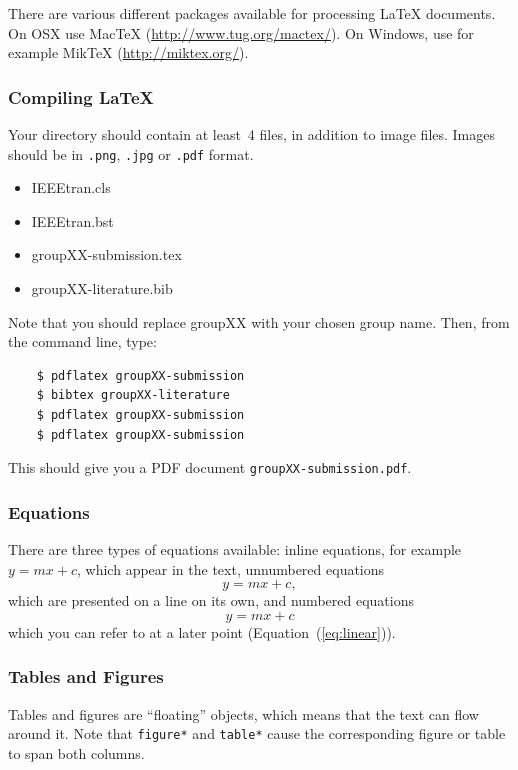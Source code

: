 \documentclass[10pt,conference,compsocconf]{IEEEtran}
\begin{document}
	There are various different packages available for processing \LaTeX{}
	documents.
	On OSX use Mac\TeX{}
	(\url{http://www.tug.org/mactex/}). On Windows, use for example Mik\TeX{} (\url{http://miktex.org/}).
	
	\subsubsection{Compiling \LaTeX{}}
	Your directory should contain at least~4 files, in addition to image
	files. Images should be in \texttt{.png}, \texttt{.jpg} or
	\texttt{.pdf} format.
	\begin{itemize}
		\item IEEEtran.cls
		\item IEEEtran.bst
		\item groupXX-submission.tex
		\item groupXX-literature.bib
	\end{itemize}
	Note that you should replace groupXX with your chosen group name.
	Then, from the command line, type:
	\begin{verbatim}
	$ pdflatex groupXX-submission
	$ bibtex groupXX-literature
	$ pdflatex groupXX-submission
	$ pdflatex groupXX-submission
	\end{verbatim}
	This should give you a PDF document \texttt{groupXX-submission.pdf}.
	
	\subsubsection{Equations}
	
	There are three types of equations available: inline equations, for
	example $y=mx + c$, which appear in the text, unnumbered equations
	$$y=mx + c,$$
	which are presented on a line on its own, and numbered equations
	\begin{equation}
	\label{eq:linear}
	y = mx + c
	\end{equation}
	which you can refer to at a later point (Equation~(\ref{eq:linear})).
	
	\subsubsection{Tables and Figures}
	
	Tables and figures are ``floating'' objects, which means that the text
	can flow around it.
	Note
	that \texttt{figure*} and \texttt{table*} cause the corresponding
	figure or table to span both columns.
	
\end{document}
